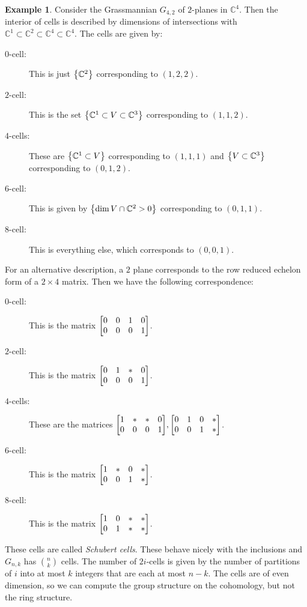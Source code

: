 \documentclass[leqno, openany]{memoir}
\theoremstyle{definition}
\newtheorem{exm}[thm]{Example}
\theoremstyle{remark}
\theoremstyle{plain}
\theoremstyle{definition}
\theoremstyle{remark}
\newcommand{\C}{\mathbb{C}}
\begin{document}
\begin{exm}
    Consider the Grassmannian $G_{4,2}$ of $2$-planes in $\C^4$. Then the interior of cells is described by dimensions of intersections with $\C^1 \subset \C^2 \subset \C^4 \subset \C^4$. The cells are given by:
    \begin{description}
        \item[$0$-cell:] This is just $\qty{\C^2}$ corresponding to $(1,2,2)$.
        \item[$2$-cell:] This is the set $\qty{\C^1 \subset V \subset \C^3}$ corresponding to $(1,1,2)$.
        \item[$4$-cells:] These are $\qty{\C^1 \subset V}$ corresponding to $(1,1,1)$ and $\qty{V \subset \C^3}$ corresponding to $(0,1,2)$.
        \item[$6$-cell:] This is given by $\qty{\dim V \cap \C^2 > 0}$ corresponding to $(0,1,1)$.
        \item[$8$-cell:] This is everything else, which corresponds to $(0,0,1)$.
    \end{description}
\end{exm}

For an alternative description, a $2$ plane corresponds to the row reduced echelon form of a $2 \times 4$ matrix. Then we have the following correspondence:
\begin{description}
    \item[$0$-cell:] This is the matrix $\mqty[ 0 & 0 & 1 & 0 \\ 0 & 0 & 0 & 1 ]$.
    \item[$2$-cell:] This is the matrix $\mqty[ 0 & 1 & * & 0 \\ 0 & 0 & 0 & 1 ]$.
    \item[$4$-cells:] These are the matrices $\mqty[ 1 & * & * & 0 \\ 0 & 0 & 0 & 1 ], \mqty[ 0 & 1 & 0 & * \\ 0 & 0 & 1 & * ]$.
    \item[$6$-cell:] This is the matrix $\mqty[ 1 & * & 0 & * \\ 0 & 0 & 1 & * ]$.
    \item[$8$-cell:] This is the matrix $\mqty[ 1 & 0 & * & * \\ 0 & 1 & * & * ]$.
\end{description}
These cells are called \textit{Schubert cells}. These behave nicely with the inclusions and $G_{n,k}$ has $\binom{n}{k}$ cells. The number of $2i$-cells is given by the number of partitions of $i$ into at most $k$ integers that are each at most $n-k$. The cells are of even dimension, so we can compute the group structure on the cohomology, but not the ring structure.
\end{document}
